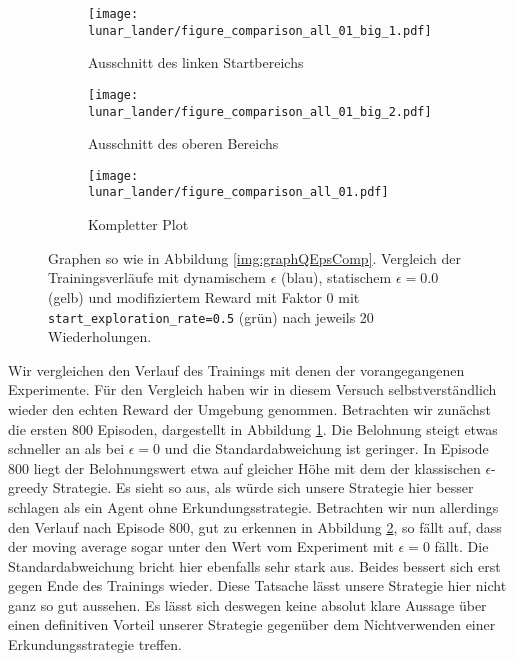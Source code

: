 \begin{figure}[h!]
    \centering
    \begin{subfigure}[b]{0.49\textwidth}
        \texttt{[image: lunar\_lander/figure\_comparison\_all\_01\_big\_1.pdf]}
        \caption{Ausschnitt des linken Startbereichs}
        \label{img:lunarComparisonAll01Big1}
    \end{subfigure}
    \begin{subfigure}[b]{0.49\textwidth}
        \texttt{[image: lunar\_lander/figure\_comparison\_all\_01\_big\_2.pdf]}
        \caption{Ausschnitt des oberen Bereichs}
        \label{img:lunarComparisonAll01Big2}
    \end{subfigure}
    \begin{subfigure}[b]{0.7\textwidth}
        \texttt{[image: lunar\_lander/figure\_comparison\_all\_01.pdf]}
        \caption{Kompletter Plot}
        \label{img:lunarComparisonAll01}
    \end{subfigure}
    \caption{Graphen so wie in Abbildung \ref{img:graphQEpsComp}. Vergleich der Trainingsverläufe mit dynamischem $ \epsilon $ (blau), statischem $ \epsilon = 0.0 $ (gelb) und modifiziertem Reward mit Faktor 0 mit \texttt{start_exploration_rate=0.5} (grün) nach jeweils 20 Wiederholungen.}
    \label{img:lunarComparisonAll01All}
\end{figure}

Wir vergleichen den Verlauf des Trainings mit denen der vorangegangenen Experimente. Für den Vergleich haben wir in diesem Versuch selbstverständlich wieder den echten Reward der Umgebung genommen. Betrachten wir zunächst die ersten 800 Episoden, dargestellt in Abbildung \ref{img:lunarComparisonAll01Big1}. Die Belohnung steigt etwas schneller an als bei $ \epsilon = 0 $ und die Standardabweichung ist geringer. In Episode 800 liegt der Belohnungswert etwa auf gleicher Höhe mit dem der klassischen $ \epsilon $-greedy Strategie. Es sieht so aus, als würde sich unsere Strategie hier besser schlagen als ein Agent ohne Erkundungsstrategie. Betrachten wir nun allerdings den Verlauf nach Episode 800, gut zu erkennen in Abbildung \ref{img:lunarComparisonAll01Big2}, so fällt auf, dass der moving average sogar unter den Wert vom Experiment mit $ \epsilon = 0 $ fällt. Die Standardabweichung bricht hier ebenfalls sehr stark aus. Beides bessert sich erst gegen Ende des Trainings wieder. Diese Tatsache lässt unsere Strategie hier nicht ganz so gut aussehen. Es lässt sich deswegen keine absolut klare Aussage über einen definitiven Vorteil unserer Strategie gegenüber dem Nichtverwenden einer Erkundungsstrategie treffen.

